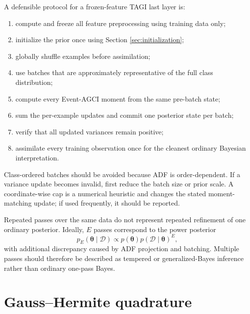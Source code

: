\documentclass[11pt]{article}
\begin{document}
A defensible protocol for a frozen-feature TAGI last layer is:
\begin{enumerate}
 \item compute and freeze all feature preprocessing using training data only;
 \item initialize the prior once using Section \ref{sec:initialization};
 \item globally shuffle examples before assimilation;
 \item use batches that are approximately representative of the full class
 distribution;
 \item compute every Event-AGCI moment from the same pre-batch state;
 \item sum the per-example updates and commit one posterior state per batch;
 \item verify that all updated variances remain positive;
 \item assimilate every training observation once for the cleanest ordinary
 Bayesian interpretation.
\end{enumerate}
Class-ordered batches should be avoided because ADF is order-dependent.  If a
variance update becomes invalid, first reduce the batch size or prior scale.
A coordinate-wise cap is a numerical heuristic and changes the stated
moment-matching update; if used frequently, it should be reported.

Repeated passes over the same data do not represent repeated refinement of one
ordinary posterior.  Ideally, $E$ passes correspond to the power posterior
\begin{equation}
 p_E(\bm\theta\mid\mathcal D)
 \propto
 p(\bm\theta)
 p(\mathcal D\mid\bm\theta)^E,
\end{equation}
with additional discrepancy caused by ADF projection and batching.  Multiple
passes should therefore be described as tempered or generalized-Bayes
inference rather than ordinary one-pass Bayes.

\section{Gauss--Hermite quadrature}
\end{document}

